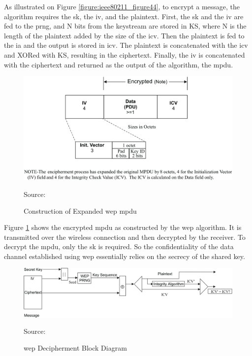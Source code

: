 As illustrated on Figure \ref{figure:ieee80211_figure44}, to encrypt a message, the algorithm requires the \gls{sk}, the \gls{iv}, and the plaintext. First, the \gls{sk} and the \gls{iv} are fed to the \gls{prng}, and \gls{N} bits from the keystream are stored in \gls{KS}, where \gls{N} is the length of the plaintext added by the size of the \gls{icv}. Then the plaintext is fed to the \gls{ia} and the output is stored in \gls{icv}. The plaintext is concatenated with the \gls{icv} and XORed with \gls{KS}, resulting in the ciphertext. Finally, the \gls{iv} is concatenated with the ciphertext and returned as the output of the algorithm, the \gls{mpdu}.

\begin{figure}[h]
    \centering
    \includegraphics[width=\linewidth]{contents/background-in-wireless-networks/protected-network-standards/wep/algorithm/construction-of-expanded-wep-mpdu.png}
    \caption{Construction of Expanded \gls{wep} \gls{mpdu}}
    {Source: \cite{ieee_80211_2020}}
    \label{figure:ieee80211_figure46}
\end{figure}

Figure \ref{figure:ieee80211_figure46} shows the encrypted \gls{mpdu} as constructed by the \gls{wep} algorithm. It is transmitted over the wireless connection and then decrypted by the receiver. To decrypt the \gls{mpdu}, only the \gls{sk} is required. So the confidentiality of the data channel established using \gls{wep} essentially relies on the secrecy of the shared key.

\begin{figure}[h]
    \centering
    \includegraphics[width=\linewidth]{contents/background-in-wireless-networks/protected-network-standards/wep/algorithm/wep-decipherment-block-diagram.png}
    \caption{\gls{wep} Decipherment Block Diagram}
    {Source: \cite{ieee_80211_2020}}
    \label{figure:ieee80211_figure45}
\end{figure}


